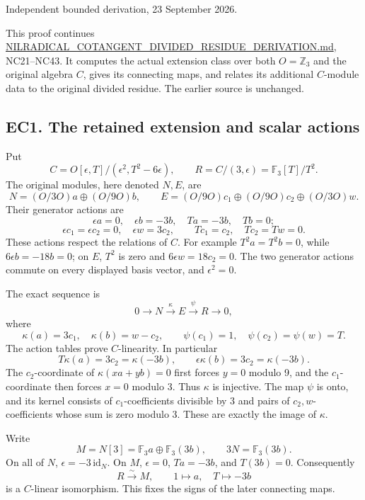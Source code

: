 \documentclass[
  10pt,
  a4paper,
]{article}
\begin{document}
Independent bounded derivation, 23 September 2026.

This proof continues
\href{https://github.com/KokunoYumeto/zeta-function-research-reader/blob/5a89872598df0902b7c1393cf8e4692ca3010a95/workbenches/splitzero-tandem/branches/tau-zero-prime-positivity/research_calculations/NILRADICAL_COTANGENT_DIVIDED_RESIDUE_DERIVATION.md}{NILRADICAL\_COTANGENT\_DIVIDED\_RESIDUE\_DERIVATION.md},
NC21--NC43. It computes the actual extension class over both
\(O=\mathbb Z_3\) and the original algebra \(C\), gives its connecting
maps, and relates its additional \(C\)-module data to the original
divided residue. The earlier source is unchanged.

\subsection{EC1. The retained extension and scalar
actions}\label{ec1.-the-retained-extension-and-scalar-actions}

Put \[
C=O[\epsilon,T]/(\epsilon^2,T^2-6\epsilon),\qquad
R=C/(3,\epsilon)=\mathbb F_3[T]/T^2.
\tag{EC1}
\] The original modules, here denoted \(N,E\), are \[
N=(O/3O)a\oplus(O/9O)b,\qquad
E=(O/9O)c_1\oplus(O/9O)c_2\oplus(O/3O)w.
\tag{EC2}
\] Their generator actions are \[
\epsilon a=0,\quad\epsilon b=-3b,\quad
Ta=-3b,\quad Tb=0;
\tag{EC3}
\] \[
\epsilon c_1=\epsilon c_2=0,\quad\epsilon w=3c_2,\qquad
Tc_1=c_2,\quad Tc_2=Tw=0.
\tag{EC4}
\] These actions respect the relations of \(C\). For example
\(T^2a=T^2b=0\), while \(6\epsilon b=-18b=0\); on \(E\), \(T^2\) is zero
and \(6\epsilon w=18c_2=0\). The two generator actions commute on every
displayed basis vector, and \(\epsilon^2=0\).

The exact sequence is \[
0\longrightarrow N\xrightarrow{\kappa}E\xrightarrow{\psi}R
\longrightarrow0,
\tag{EC5}
\] where \[
\kappa(a)=3c_1,\quad\kappa(b)=w-c_2,\qquad
\psi(c_1)=1,\quad\psi(c_2)=\psi(w)=T.
\tag{EC6}
\] The action tables prove \(C\)-linearity. In particular \[
T\kappa(a)=3c_2=\kappa(-3b),\qquad
\epsilon\kappa(b)=3c_2=\kappa(-3b).
\] The \(c_2\)-coordinate of \(\kappa(xa+yb)=0\) first forces \(y=0\)
modulo 9, and the \(c_1\)-coordinate then forces \(x=0\) modulo 3. Thus
\(\kappa\) is injective. The map \(\psi\) is onto, and its kernel
consists of \(c_1\)-coefficients divisible by 3 and pairs of
\(c_2,w\)-coefficients whose sum is zero modulo 3. These are exactly the
image of \(\kappa\).

Write \[
M=N[3]=\mathbb F_3a\oplus\mathbb F_3(3b),\qquad
3N=\mathbb F_3(3b).
\tag{EC7}
\] On all of \(N\), \(\epsilon=-3\,\mathrm{id}_N\). On \(M\),
\(\epsilon=0\), \(Ta=-3b\), and \(T(3b)=0\). Consequently \[
R\xrightarrow{\sim}M,\qquad 1\mapsto a,\quad T\mapsto-3b
\tag{EC8}
\] is a \(C\)-linear isomorphism. This fixes the signs of the later
connecting maps.
\end{document}
